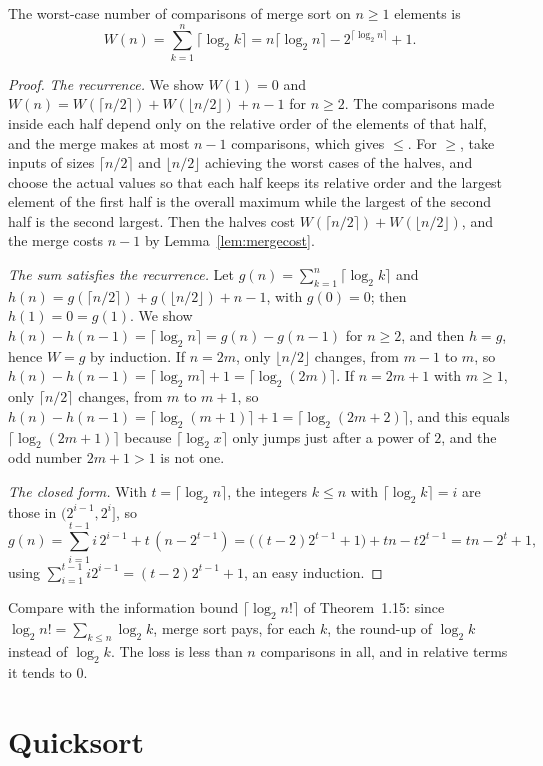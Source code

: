 \begin{theorem}\label{thm:mergeexact}
The worst-case number of comparisons of merge sort on $n\ge1$ elements is
\[
W(n)=\sum_{k=1}^n\lceil\log_2k\rceil=n\lceil\log_2n\rceil-2^{\lceil\log_2n\rceil}+1.
\]
\end{theorem}
\begin{proof}
\emph{The recurrence.} We show $W(1)=0$ and $W(n)=W(\lceil n/2\rceil)+W(\lfloor n/2\rfloor)+n-1$ for $n\ge2$. The comparisons made inside each half depend only
on the relative order of the elements of that half, and the merge makes at most $n-1$ comparisons, which gives $\le$. For $\ge$, take inputs of
sizes $\lceil n/2\rceil$ and $\lfloor n/2\rfloor$ achieving the worst cases of the halves, and choose the actual values so that each half keeps its relative order and
the largest element of the first half is the overall maximum while the largest of the second half is the second largest. Then the halves
cost $W(\lceil n/2\rceil)+W(\lfloor n/2\rfloor)$, and the merge costs $n-1$ by Lemma~\ref{lem:mergecost}.

\emph{The sum satisfies the recurrence.} Let $g(n)=\sum_{k=1}^n\lceil\log_2k\rceil$ and $h(n)=g(\lceil n/2\rceil)+g(\lfloor n/2\rfloor)+n-1$, with $g(0)=0$; then $h(1)=0=g(1)$. We show
$h(n)-h(n-1)=\lceil\log_2n\rceil=g(n)-g(n-1)$ for $n\ge2$, and then $h=g$, hence $W=g$ by induction. If $n=2m$, only $\lfloor n/2\rfloor$ changes, from $m-1$ to $m$,
so $h(n)-h(n-1)=\lceil\log_2m\rceil+1=\lceil\log_2(2m)\rceil$. If $n=2m+1$ with $m\ge1$, only $\lceil n/2\rceil$ changes, from $m$ to $m+1$, so $h(n)-h(n-1)=\lceil\log_2(m+1)\rceil+1=\lceil\log_2(2m+2)\rceil$, and
this equals $\lceil\log_2(2m+1)\rceil$ because $\lceil\log_2x\rceil$ only jumps just after a power of $2$, and the odd number $2m+1>1$ is not one.

\emph{The closed form.} With $t=\lceil\log_2n\rceil$, the integers $k\le n$ with $\lceil\log_2k\rceil=i$ are those in $(2^{i-1},2^i]$, so
\[
g(n)=\sum_{i=1}^{t-1}i\,2^{i-1}+t\,(n-2^{t-1})=\bigl((t-2)2^{t-1}+1\bigr)+tn-t2^{t-1}=tn-2^t+1,
\]
using $\sum_{i=1}^{t-1}i2^{i-1}=(t-2)2^{t-1}+1$, an easy induction.
\end{proof}

Compare with the information bound $\lceil\log_2n!\rceil$ of Theorem~1.15: since $\log_2n!=\sum_{k\le n}\log_2k$, merge sort pays, for each $k$, the
round-up of $\log_2k$ instead of $\log_2k$. The loss is less than $n$ comparisons in all, and in relative terms it tends to $0$.

\section{Quicksort}\label{sec:quicksort}

